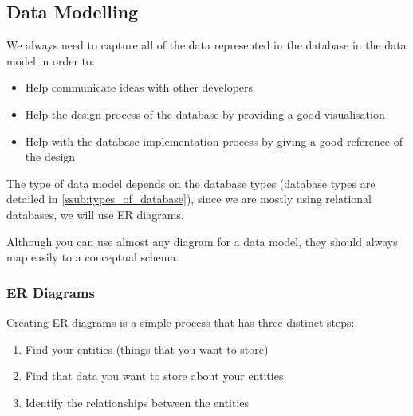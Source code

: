 \subsection{Data Modelling}\label{sub:data_modelling}

We always need to capture all of the data represented in the database in the data model in order to:
\begin{itemize}
    \item Help communicate ideas with other developers
    \item Help the design process of the database by providing a good visualisation
    \item Help with the database implementation process by giving a good reference of the design
\end{itemize}

The type of data model depends on the database types (database types are detailed in \cref{ssub:types_of_database}), since we are mostly using relational databases, we will use ER diagrams.

\begin{note}
    Although you can use almost any diagram for a data model, they should always map easily to a conceptual schema.
\end{note}

\subsubsection{ER Diagrams}\label{ssub:er_diagrams}

Creating ER diagrams is a simple process that has three distinct steps:
\begin{enumerate}
    \item Find your entities (things that you want to store)
    \item Find that data you want to store about your entities
    \item Identify the relationships between the entities
\end{enumerate}

